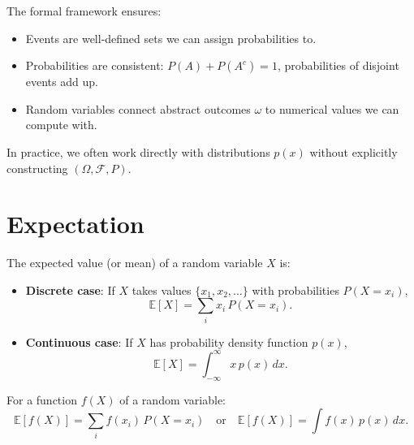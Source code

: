 \begin{remark}
    The formal framework ensures:
    \begin{itemize}
        \item Events are well-defined sets we can assign probabilities to.
        \item Probabilities are consistent: $P(A) + P(A^c) = 1$, probabilities of disjoint events add up.
        \item Random variables connect abstract outcomes $\omega$ to numerical values we can compute with.
    \end{itemize}
    In practice, we often work directly with distributions $p(x)$ without explicitly constructing $(\Omega, \mathcal{F}, P)$.
\end{remark}

\section{Expectation}

\begin{definition}
    The expected value (or mean) of a random variable $X$ is:
    \begin{itemize}
        \item \textbf{Discrete case}: If $X$ takes values $\{x_1, x_2, \ldots\}$ with probabilities $P(X = x_i)$,
              \[
                  \mathbb{E}[X] = \sum_{i} x_i \, P(X = x_i).
              \]
        \item \textbf{Continuous case}: If $X$ has probability density function $p(x)$,
              \[
                  \mathbb{E}[X] = \int_{-\infty}^{\infty} x \, p(x) \, dx.
              \]
    \end{itemize}
    For a function $f(X)$ of a random variable:
    \[
        \mathbb{E}[f(X)] = \sum_{i} f(x_i) \, P(X = x_i) \quad \text{or} \quad \mathbb{E}[f(X)] = \int f(x) \, p(x) \, dx.
    \]
\end{definition}

